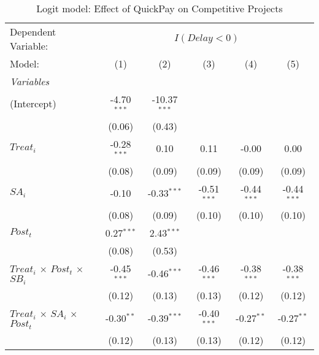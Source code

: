 \documentclass[
]{article}
\begin{document}
\begin{table}[htbp]
   \centering
   \caption{Logit model: Effect of QuickPay on Competitive Projects}
   \begin{tabular}{lccccc}
      \tabularnewline\midrule\midrule
      Dependent Variable: & \multicolumn{5}{c}{$I(Delay<0)$}\\
      Model:                                        & (1)           & (2)            & (3)           & (4)           & (5)\\
      \midrule \emph{Variables} &   &   &   &   &  \\
      (Intercept)                                   & -4.70$^{***}$ & -10.37$^{***}$ &               &               &   \\
                                                    & (0.06)        & (0.43)         &               &               &   \\
      $Treat_i$                                     & -0.28$^{***}$ & 0.10           & 0.11          & -0.00         & 0.00\\
                                                    & (0.08)        & (0.09)         & (0.09)        & (0.09)        & (0.09)\\
      $SA_i$                                        & -0.10         & -0.33$^{***}$  & -0.51$^{***}$ & -0.44$^{***}$ & -0.44$^{***}$\\
                                                    & (0.08)        & (0.09)         & (0.10)        & (0.10)        & (0.10)\\
      $Post_t$                                      & 0.27$^{***}$  & 2.43$^{***}$   &               &               &   \\
                                                    & (0.08)        & (0.53)         &               &               &   \\
      $Treat_i$ $\times$ $Post_t$ $\times$ $SB_i$ & -0.45$^{***}$ & -0.46$^{***}$  & -0.46$^{***}$ & -0.38$^{***}$ & -0.38$^{***}$\\
                                                    & (0.12)        & (0.13)         & (0.13)        & (0.12)        & (0.12)\\
      $Treat_i$ $\times$ $SA_i$ $\times$ $Post_t$ & -0.30$^{**}$  & -0.39$^{***}$  & -0.40$^{***}$ & -0.27$^{**}$  & -0.27$^{**}$\\
                                                    & (0.12)        & (0.13)         & (0.13)        & (0.12)        & (0.12)\\

\end{tabular}
\end{table}
\end{document}
